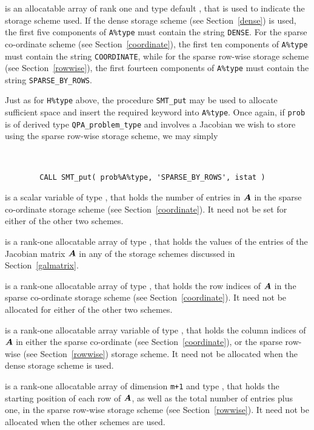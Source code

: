 \documentclass{galahad}
\newcommand{\packagename}{QPA}
\begin{document}
\begin{description}
\begin{description}

 is an allocatable array of rank one and type default \character, that
is used to indicate the storage scheme used. If the dense storage scheme 
(see Section~\ref{dense}) is used, 
the first five components of {\tt A\%type} must contain the
string {\tt DENSE}.
For the sparse co-ordinate scheme (see Section~\ref{coordinate}), 
the first ten components of {\tt A\%type} must contain the
string {\tt COORDINATE}, while 
for the sparse row-wise storage scheme (see Section~\ref{rowwise}),
the first fourteen components of {\tt A\%type} must contain the
string {\tt SPARSE\_BY\_ROWS}.

Just as for {\tt H\%type} above, the procedure {\tt SMT\_put} 
may be used to allocate sufficient space and insert the required keyword
into {\tt A\%type}.
Once again, if {\tt prob} is of derived type {\tt \packagename\_problem\_type}
and involves a Jacobian we wish to store using the sparse row-wise 
storage scheme, we may simply
{\tt 
\begin{verbatim}
        CALL SMT_put( prob%A%type, 'SPARSE_BY_ROWS', istat )
\end{verbatim}
}
\noindent

 is a scalar variable of type \integer, that 
holds the number of entries in ${\bm{A}}$
in the sparse co-ordinate storage scheme (see Section~\ref{coordinate}). 
It need not be set for either of the other two schemes.

 is a rank-one allocatable array of type \realdp, that holds
the values of the entries of the Jacobian matrix ${\bm{A}}$ in any of the 
storage schemes discussed in Section~\ref{galmatrix}.

 is a rank-one allocatable array of type \integer,
that holds the row indices of ${\bm{A}}$ in the sparse co-ordinate storage
scheme (see Section~\ref{coordinate}). 
It need not be allocated for either of the other two schemes.

 is a rank-one allocatable array variable of type \integer,
that holds the column indices of ${\bm{A}}$ in either the sparse co-ordinate 
(see Section~\ref{coordinate}), or the sparse row-wise 
(see Section~\ref{rowwise}) storage scheme.
It need not be allocated when the dense storage scheme is used.

 is a rank-one allocatable array of dimension {\tt m+1} and type 
\integer, that holds the 
starting position of each row of ${\bm{A}}$, as well
as the total number of entries plus one, in the sparse row-wise storage
scheme (see Section~\ref{rowwise}). It need not be allocated when the
other schemes are used.


\end{description}
\end{description}
\end{document}
